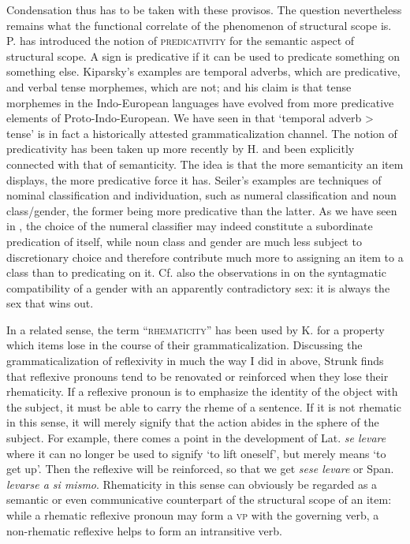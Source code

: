 Condensation thus has to be taken with these provisos. The question nevertheless remains what the functional correlate of the phenomenon of structural scope is. P. \citet{Kiparsky1968} has introduced the notion of \textsc{predicativity} for the semantic aspect of structural scope. A sign is predicative if it can be used to predicate something on something else. Kiparsky's examples are temporal adverbs, which are predicative, and verbal tense morphemes, which are not; and his claim is that tense morphemes in the Indo-European languages have evolved from more predicative elements of Proto-Indo-European. We have seen in  that ‘temporal adverb {\textgreater} tense’ is in fact a historically attested grammaticalization channel. The notion of predicativity has been taken up more recently by H. \citet{Seiler1982} and been explicitly connected with that of semanticity. The idea is that the more semanticity an item displays, the more predicative force it has. Seiler's examples are techniques of nominal classification and individuation, such as numeral classification and noun class/gender, the former being more predicative than the latter. As we have seen in , the choice of the numeral classifier may indeed constitute a subordinate predication of itself, while noun class and gender are much less subject to discretionary choice and therefore contribute much more to assigning an item to a class than to predicating on it. Cf. also the observations in  on the syntagmatic compatibility of a gender with an apparently contradictory sex: it is always the sex that wins out.

In a related sense, the term ``\textsc{rhematicity}'' has been used by K. \citet{Strunk1980} for a property which items lose in the course of their grammaticalization. Discussing the grammaticalization of reflexivity in much the way I did in  above, Strunk finds that reflexive pronouns tend to be renovated or reinforced when they lose their rhematicity. If a reflexive pronoun is to emphasize the identity of the object with the subject, it must be able to carry the rheme of a sentence. If it is not rhematic in this sense, it will merely signify that the action abides in the sphere of the subject. For example, there comes a point in the development of Lat. \textit{se levare} where it can no longer be used to signify ‘to lift oneself’, but merely means ‘to get up’. Then the reflexive will be reinforced, so that we get \textit{sese levare} or Span. \textit{levarse a si mismo}. Rhematicity in this sense can obviously be regarded as a semantic or even communicative counterpart of the structural scope of an item: while a rhematic reflexive pronoun may form a \textsc{vp} with the governing verb, a non-rhematic reflexive helps to form an intransitive verb.

